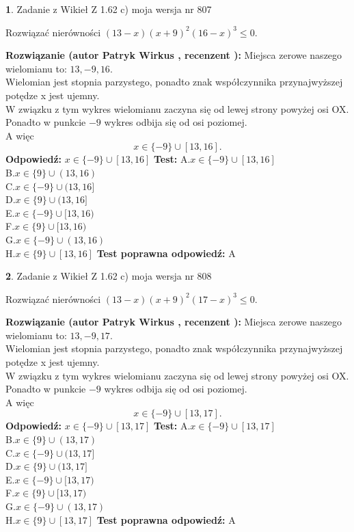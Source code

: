 \documentclass[12pt, a4paper]{article}
\theoremstyle{definition} %
\newtheorem{zad}{}
\newcommand{\zadStart}[1]{\begin{zad}#1\newline}
\newcommand{\zadStop}{\end{zad}}
\newcommand{\rozwStart}[2]{\noindent \textbf{Rozwiązanie (autor #1 , recenzent #2): }\newline}
\newcommand{\rozwStop}{\newline}
\newcommand{\odpStart}{\noindent \textbf{Odpowiedź:}\newline}
\newcommand{\odpStop}{\newline}
\newcommand{\testStart}{\noindent \textbf{Test:}\newline}
\newcommand{\testStop}{\newline}
\newcommand{\kluczStart}{\noindent \textbf{Test poprawna odpowiedź:}\newline}
\newcommand{\kluczStop}{\newline}
\begin{document}
\zadStart{Zadanie z Wikieł Z 1.62 c) moja wersja nr 807}

Rozwiązać nierówności $(13-x)(x+9)^{2}(16-x)^{3}\le0$.
\zadStop
\rozwStart{Patryk Wirkus}{}
Miejsca zerowe naszego wielomianu to: $13, -9, 16$.\\
Wielomian jest stopnia parzystego, ponadto znak współczynnika przy\linebreak najwyższej potędze x jest ujemny.\\ W związku z tym wykres wielomianu zaczyna się od lewej strony powyżej osi OX.\\
Ponadto w punkcie $-9$ wykres odbija się od osi poziomej.\\
A więc $$x \in \{-9\} \cup [13,16].$$
\rozwStop
\odpStart
$x \in \{-9\} \cup [13,16]$
\odpStop
\testStart
A.$x \in \{-9\} \cup [13,16]$\\
B.$x \in \{9\} \cup (13,16)$\\
C.$x \in \{-9\} \cup (13,16]$\\
D.$x \in \{9\} \cup (13,16]$\\
E.$x \in \{-9\} \cup [13,16)$\\
F.$x \in \{9\} \cup [13,16)$\\
G.$x \in \{-9\} \cup (13,16)$\\
H.$x \in \{9\} \cup [13,16]$
\testStop
\kluczStart
A
\kluczStop



\zadStart{Zadanie z Wikieł Z 1.62 c) moja wersja nr 808}

Rozwiązać nierówności $(13-x)(x+9)^{2}(17-x)^{3}\le0$.
\zadStop
\rozwStart{Patryk Wirkus}{}
Miejsca zerowe naszego wielomianu to: $13, -9, 17$.\\
Wielomian jest stopnia parzystego, ponadto znak współczynnika przy\linebreak najwyższej potędze x jest ujemny.\\ W związku z tym wykres wielomianu zaczyna się od lewej strony powyżej osi OX.\\
Ponadto w punkcie $-9$ wykres odbija się od osi poziomej.\\
A więc $$x \in \{-9\} \cup [13,17].$$
\rozwStop
\odpStart
$x \in \{-9\} \cup [13,17]$
\odpStop
\testStart
A.$x \in \{-9\} \cup [13,17]$\\
B.$x \in \{9\} \cup (13,17)$\\
C.$x \in \{-9\} \cup (13,17]$\\
D.$x \in \{9\} \cup (13,17]$\\
E.$x \in \{-9\} \cup [13,17)$\\
F.$x \in \{9\} \cup [13,17)$\\
G.$x \in \{-9\} \cup (13,17)$\\
H.$x \in \{9\} \cup [13,17]$
\testStop
\kluczStart
A
\kluczStop
\end{document}

